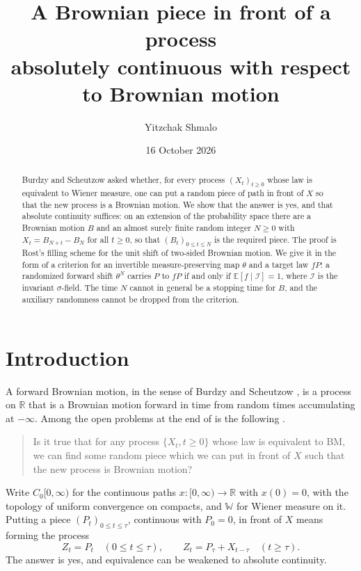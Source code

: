 \documentclass[11pt]{amsart}
\title[A Brownian piece in front of a process]{A Brownian piece in front of a process\\ absolutely continuous with respect to Brownian motion}
\author{Yitzchak Shmalo}
\date{16 October 2026}
\theoremstyle{remark}
\numberwithin{equation}{section}
\newcommand{\E}{\mathbb E}
\newcommand{\R}{\mathbb R}
\newcommand{\I}{\mathcal I}
\newcommand{\Wi}{\mathbb W}
\begin{document}
\begin{abstract}
Burdzy and Scheutzow asked whether, for every process $(X_t)_{t\ge0}$ whose law is equivalent to Wiener measure, one can put a random piece of path in front of $X$ so that the new process is a Brownian motion. We show that the answer is yes, and that absolute continuity suffices: on an extension of the probability space there are a Brownian motion $B$ and an almost surely finite random integer $N\ge0$ with $X_t=B_{N+t}-B_N$ for all $t\ge0$, so that $(B_t)_{0\le t\le N}$ is the required piece. The proof is Rost's filling scheme for the unit shift of two-sided Brownian motion. We give it in the form of a criterion for an invertible measure-preserving map $\theta$ and a target law $fP$: a randomized forward shift $\theta^N$ carries $P$ to $fP$ if and only if $\E[f\mid\I]=1$, where $\I$ is the invariant $\sigma$-field. The time $N$ cannot in general be a stopping time for $B$, and the auxiliary randomness cannot be dropped from the criterion.
\end{abstract}
\maketitle

\section{Introduction}\label{sec:intro}

A forward Brownian motion, in the sense of Burdzy and Scheutzow \cite{BS}, is a process on $\R$ that is a Brownian motion forward in time from random times accumulating at $-\infty$. Among the open problems at the end of \cite{BS} is the following \cite[Problem~7.5, p.~125]{BS}.

\begin{quote}
Is it true that for any process $\{X_t, t\ge0\}$ whose law is equivalent to BM, we can find some random piece which we can put in front of $X$ such that the new process is Brownian motion?
\end{quote}

Write $C_0[0,\infty)$ for the continuous paths $x:[0,\infty)\to\R$ with $x(0)=0$, with the topology of uniform convergence on compacts, and $\Wi$ for Wiener measure on it. Putting a piece $(P_t)_{0\le t\le\tau}$, continuous with $P_0=0$, in front of $X$ means forming the process
\begin{equation}\label{eq:concat}
Z_t=P_t\quad(0\le t\le\tau),\qquad Z_t=P_\tau+X_{t-\tau}\quad(t\ge\tau).
\end{equation}
The answer is yes, and equivalence can be weakened to absolute continuity.
\end{document}
